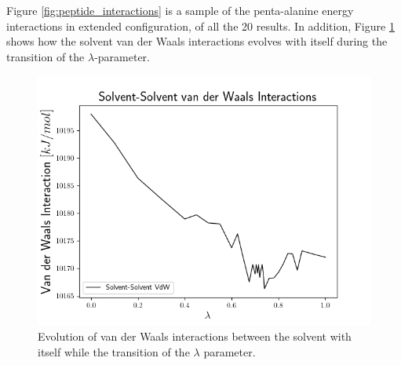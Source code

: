 Figure \ref{fig:peptide_interactions} is a sample of the penta-alanine energy interactions in extended configuration, of all the 20 results. In addition, Figure \ref{fig:solvent_vdw} shows how the solvent van der Waals interactions evolves with itself during the transition of the $\lambda$-parameter.  
\begin{figure}[h]
    \centering
    \includegraphics[scale=0.7]{Figures/Chapter_6/Solvent_vdw_Interactions.png}
    \caption{Evolution of van der Waals interactions between the solvent with itself while the transition of the $\lambda$ parameter.}
    \label{fig:solvent_vdw}
\end{figure}


